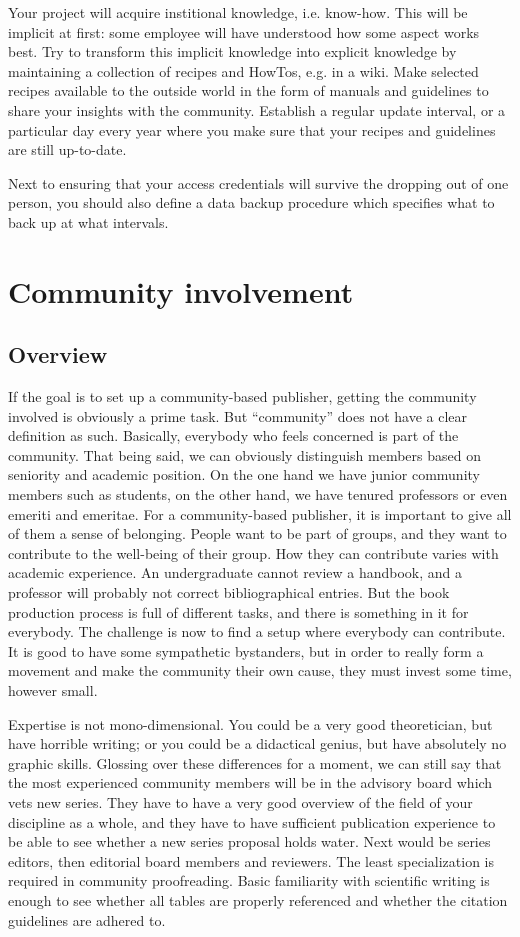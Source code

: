 \documentclass[guidelines,nonflat,modfonts] {langsci/langscibook}
\begin{document}
Your project will acquire institional knowledge, i.e. know-how. This will be implicit at first: some employee will have understood how some aspect works best. Try to transform this implicit knowledge into explicit knowledge by maintaining a collection of recipes and HowTos, e.g. in  a wiki. Make selected recipes available to the outside world in the form of manuals and guidelines to share your insights with the community. Establish a regular update interval, or a particular day every year where you make sure that your recipes and guidelines are still up-to-date. 

Next to ensuring that your access credentials will survive the dropping out of one person, you should also define a data backup procedure which specifies what to back up at what intervals. 


\section{Community involvement}\label{sec:community}
\subsection{Overview}
If the goal is to set up a community-based publisher, getting the community involved is obviously a prime task. But ``community'' does not have a clear definition as such. Basically, everybody who feels concerned is part of the community. That being said, we can obviously distinguish members based on seniority and academic position. On the one hand we have junior community members such as students, on the other hand, we have tenured professors or even emeriti and emeritae. For a community-based publisher, it is important to give all of them a sense of belonging.  People want to be part of groups, and they want to contribute to the well-being of their group. How they can contribute varies with academic experience. An undergraduate cannot review a handbook, and a professor will probably not correct bibliographical entries. But the book production process is full of different tasks, and there is something in it for everybody. The challenge is now to find a setup where everybody can contribute. It is good to have some sympathetic bystanders, but in order to really form a movement and make the community their own cause, they must invest some time, however small. 

Expertise is not mono-dimensional. You could be a very good theoretician, but have horrible writing; or you could be a didactical genius, but have absolutely no graphic skills. Glossing over these differences for a moment, we can still say that the most experienced community members will be in the advisory board which vets new series. They have to have a very good overview of the field of your discipline as a whole, and they have to have sufficient publication experience to be able to see whether a new series proposal holds water. Next would be series editors, then editorial board members and reviewers. The least specialization is required in community proofreading. Basic familiarity with scientific writing is enough to see whether all tables are properly referenced and whether the citation guidelines are adhered to. 
\end{document}
